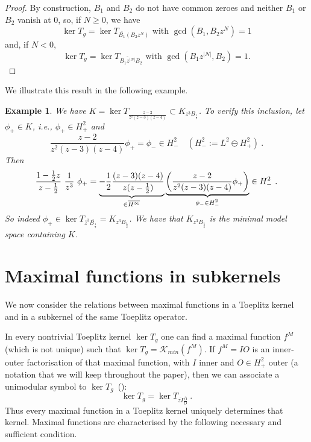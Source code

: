 \documentclass{article}
\numberwithin{equation}{section}
\theoremstyle{plain}
\newtheorem{ex}[thm]{Example}
\newcommand{\Hp}{\ensuremath{H^2_+}}
\newcommand{\Hm}{\ensuremath{H^2_-}}
\newcommand{\Hinf}{\ensuremath{H^\infty}}
\newcommand{\KK}{\ensuremath{\mathcal{K}}}
\newcommand{\ol}[1]{\ensuremath{\overline{#1}}}
\newcommand{\annot}[2]{\underbrace{#1}_{\smash[b]{\scriptstyle #2}}}
\newcommand{\kertg}{\ensuremath{\ker T_g}}
\begin{document}
\begin{proof}
By construction, $B_1$ and $B_2$ do not have common zeroes and neither $B_1$ or $B_2$ vanish at $0$, so, if $N\geq 0$, we have
\begin{equation}
\kertg = \ker T_{\ol{B_1} ( B_2 z^N )} \text{ with } \gcd (B_1, B_2 z^N ) = 1
\end{equation}
and, if $N<0$,
\begin{equation}
\kertg = \ker T_{ \ol{ B_1 z^{|N|} } B_2 } \text{ with } \gcd (B_1 z^{|N|} , B_2 ) = 1.
\end{equation}
\end{proof}


We illustrate this result in the following example.


\begin{ex}
\label{ex:rational_symbol}
We have $K = \ker T_\frac{z-2}{z^2 (z-3) (z-4)} \subset K_{z^3 B_{\frac{1}{2}}}$.
To verify this inclusion, let $\phi_+ \in K$, i.e., $\phi_+\in\Hp$ and
\begin{equation}
\frac{z-2}{z^2 (z-3) (z-4)} \phi_+ = \phi_- \in \Hm \quad (\Hm := L^2 \ominus \Hp)\ .
\end{equation}
Then
\begin{equation}
\frac{1 - \frac{1}{2} z}{z- \frac{1}{2}} \ \frac{1}{z^3} \ \phi_+ =
\annot{- \frac{1}{2} \frac{(z-3) (z-4)}{z (z-\frac{1}{2})}}{\in\ol\Hinf}
\annot{\left( \frac{z-2}{z^2 (z-3) (z-4)} \phi_+ \right)}{\phi_- \in \Hm}
\in\Hm\ .
\end{equation}
So indeed $\phi_+ \in \ker T_{\ol z^3 \ol{B_{\frac{1}{2}}}} = K_{z^3 B_{\frac{1}{2}}}$.
We have that $K_{z^3 B_{\frac{1}{2}}}$ is the minimal model space containing $K$.
\end{ex}






\section{Maximal functions in subkernels}
\label{sec:maximal_functions_subkernels}

We now consider the relations between maximal functions in a Toeplitz kernel and in a subkernel of the same Toeplitz operator.

In every nontrivial Toeplitz kernel $\kertg$ one can find a maximal function $f^M$ (which is not unique) such that $\kertg = \KK_{min}(f^M)$.
If $f^M = IO$ is an inner-outer factorisation of that maximal function, with $I$ inner and $O\in\Hp$ outer (a notation that we will keep throughout the paper), then we can associate a unimodular symbol to \kertg\ (\cite{CP14}):
\begin{equation}
\label{eq:unimod_symbol_from_max_func}
\kertg = \ker T_{\ol{zI}\frac{\ol O}{O}}\ .
\end{equation}
Thus every maximal function in a Toeplitz kernel uniquely determines that kernel.
Maximal functions are characterised by the following necessary and sufficient condition.
\end{document}
